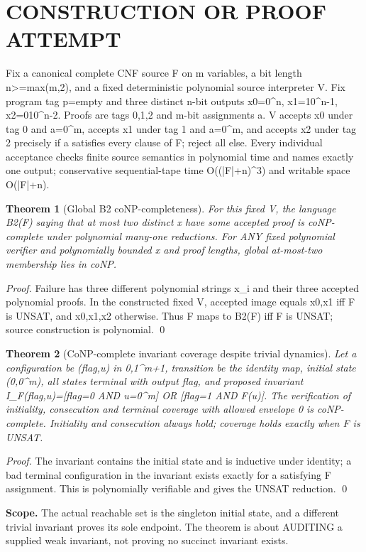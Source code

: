\documentclass[11pt]{article}
\newtheorem{theorem}{Theorem}
\begin{document}
\section{CONSTRUCTION OR PROOF ATTEMPT}
Fix a canonical complete CNF source F on m variables, a bit length n>=max(m,2), and a fixed deterministic polynomial source interpreter V. Fix program tag p=empty and three distinct n-bit outputs x0=0^n, x1=10^{n-1}, x2=010^{n-2}. Proofs are tags 0,1,2 and m-bit assignments a. V accepts x0 under tag 0 and a=0^m, accepts x1 under tag 1 and a=0^m, and accepts x2 under tag 2 precisely if a satisfies every clause of F; reject all else. Every individual acceptance checks finite source semantics in polynomial time and names exactly one output; conservative sequential-tape time O((|F|+n)^3) and writable space O(|F|+n).
\begin{theorem}[Global B2 coNP-completeness]
For this fixed V, the language B2(F) saying that at most two distinct x have some accepted proof is coNP-complete under polynomial many-one reductions. For ANY fixed polynomial verifier and polynomially bounded x and proof lengths, global at-most-two membership lies in coNP.
\end{theorem}
\noindent\emph{Proof.} Failure has three different polynomial strings x_i and their three accepted polynomial proofs. In the constructed fixed V, accepted image equals {x0,x1} iff F is UNSAT, and {x0,x1,x2} otherwise. Thus F maps to B2(F) iff F is UNSAT; source construction is polynomial. \qed
\begin{theorem}[CoNP-complete invariant coverage despite trivial dynamics]
Let a configuration be (flag,u) in {0,1}^{m+1}, transition be the identity map, initial state (0,0^m), all states terminal with output flag, and proposed invariant I_F(flag,u)=[flag=0 AND u=0^m] OR [flag=1 AND F(u)]. The verification of initiality, consecution and terminal coverage with allowed envelope {0} is coNP-complete. Initiality and consecution always hold; coverage holds exactly when F is UNSAT.
\end{theorem}
\noindent\emph{Proof.} The invariant contains the initial state and is inductive under identity; a bad terminal configuration in the invariant exists exactly for a satisfying F assignment. This is polynomially verifiable and gives the UNSAT reduction. \qed
\par\textbf{Scope.} The actual reachable set is the singleton initial state, and a different trivial invariant proves its sole endpoint. The theorem is about AUDITING a supplied weak invariant, not proving no succinct invariant exists.
\end{document}
